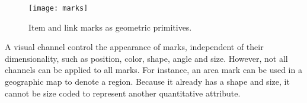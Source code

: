 \begin{figure}[!htb]
	\centering
	\texttt{[image: marks]}
	\caption{Item and link marks as geometric primitives. }
	\label{fig:lr-marks}
\end{figure}

A visual channel control the appearance of marks, independent of their dimensionality, such as position, color, shape, angle and size. However, not all channels can be applied to all marks. For instance, an area mark can be used in a geographic map to denote a region. Because it already has a shape and size, it cannot be size coded to represent another quantitative attribute. 

%

